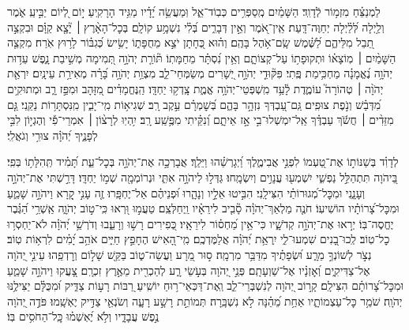 \documentclass[twoside, openany, parskip=half, 11pt]{book}
\begin{document}
\begin{narrow}
לַמְנַצֵּ֗חַ מִזְמ֥וֹר לְֿדָוִֽד׃
הַשָּׁמַ֗יִם מְֽסַפְּרִ֥ים כְּבֽוֹד־אֵ֑ל וּֽמַעֲשֵׂ֥ה יָ֝דָ֗יו מַגִּ֥יד הָרָקִֽיעַ׃
י֣וֹם לְ֭יוֹם יַבִּ֣יעַֽ אֹ֑מֶר וְלַ֥יְלָה לְּ֝לַ֗יְלָה יְחַוֶּה־דָּֽעַת׃
אֵֽין־אֹ֭מֶר וְאֵ֣ין דְּבָרִ֑ים בְּ֝לִ֗י נִשְׁמָ֥ע קוֹלָֽם׃
בְּכׇל־הָאָ֨רֶץ ׀ יָ֘צָ֤א קַוָּ֗ם וּבִקְצֵ֣ה תֵ֭בֵל מִלֵּיהֶ֑ם לַ֝שֶּׁ֗מֶשׁ שָֽׂם־אֹ֥הֶל בָּהֶֽם׃
וְה֗וּא כְּ֭חָתָן יֹצֵ֣א מֵחֻפָּת֑וֹ יָשִׂ֥ישׂ כְּ֝גִבּ֗וֹר לָר֥וּץ אֹֽרַח׃
מִקְצֵ֤ה הַשָּׁמַ֨יִם ׀ מֽוֹצָא֗וֹ וּתְקוּפָת֥וֹ עַל־קְצוֹתָ֑ם וְאֵ֥ין נִ֝סְתָּ֗ר מֵחַמָּתֽוֹ׃
תּ֘וֹרַ֤ת יְהֹוָ֣ה תְּ֭מִימָה מְשִׁ֣יבַת נָ֑פֶשׁ עֵד֥וּת יְהֹוָ֥ה נֶ֝אֱמָנָ֗ה מַחְכִּ֥ימַת פֶּֽתִי׃
פִּקּ֘וּדֵ֤י יְהֹוָ֣ה יְ֭שָׁרִים מְשַׂמְּחֵי־לֵ֑ב מִצְוַ֥ת יְהֹוָ֥ה בָּ֝רָ֗ה מְאִירַ֥ת עֵינָֽיִם׃
יִרְאַ֤ת יְהֹוָ֨ה ׀ טְהוֹרָה֮ עוֹמֶ֢דֶת לָ֫עַ֥ד מִֽשְׁפְּטֵי־יְהֹוָ֥ה אֱמֶ֑ת צָֽדְק֥וּ יַחְדָּֽו׃
הַֽנֶּחֱמָדִ֗ים מִ֭זָּהָב וּמִפַּ֣ז רָ֑ב וּמְתוּקִ֥ים מִ֝דְּבַ֗שׁ וְנֹ֣פֶת צוּפִֽים׃
גַּֽם־עַ֭בְדְּךָ נִזְהָ֣ר בָּהֶ֑ם בְּ֝שׇׁמְרָ֗ם עֵ֣קֶב רָֽב׃
שְׁגִיא֥וֹת מִֽי־יָבִ֑ין מִֽנִּסְתָּר֥וֹת נַקֵּֽנִי׃
גַּ֤ם מִזֵּדִ֨ים ׀ חֲשֹׂ֬ךְ עַבְדֶּ֗ךָ אַֽל־יִמְשְׁלוּ־בִ֣י אָ֣ז אֵיתָ֑ם וְ֝נִקֵּ֗יתִי מִפֶּ֥שַֽׁע רָֽב׃
יִ֥הְיֽוּ לְרָצ֨וֹן ׀ אִמְרֵי־פִ֡י וְהֶגְי֣וֹן לִבִּ֣י לְפָנֶ֑יךָ יְ֝הֹוָ֗ה צוּרִ֥י וְגֹאֲלִֽי׃ 


\enlargethispage{\baselineskip}

לְדָוִ֗ד 
בְּשַׁנּוֹת֣וֹ אֶת־טַ֭עְמוֹ לִפְנֵ֣י אֲבִימֶ֑לֶךְ וַ֝יְגָרְשֵׁ֗הוּ וַיֵּלַֽךְ׃
אֲבָרְכָ֣ה אֶת־יְהֹוָ֣ה בְּכׇל־עֵ֑ת תָּ֝מִ֗יד תְּֽהִלָּת֥וֹ בְּפִֽי׃
בַּ֭יהֹוָה תִּתְהַלֵּ֣ל נַפְשִׁ֑י יִשְׁמְע֖וּ עֲנָוִ֣ים וְיִשְׂמָֽחוּ׃
גַּדְּל֣וּ לַיהֹוָ֣ה אִתִּ֑י וּנְרוֹמְמָ֖ה שְׁמ֣וֹ יַחְדָּֽו׃
דָּרַ֣שְׁתִּי אֶת־יְהֹוָ֣ה וְעָנָ֑נִי וּמִכׇּל־מְ֝גוּרוֹתַ֗י הִצִּילָֽנִי׃
הִבִּ֣יטוּ אֵלָ֣יו וְנָהָ֑רוּ וּ֝פְנֵיהֶ֗ם אַל־יֶחְפָּֽרוּ׃
זֶ֤ה עָנִ֣י קָ֭רָא וַיהֹוָ֣ה שָׁמֵ֑עַ וּמִכׇּל־צָ֝רוֹתָ֗יו הוֹשִׁיעֽוֹ׃
חֹנֶ֤ה מַלְאַךְ־יְהֹוָ֓ה סָ֘בִ֤יב לִירֵאָ֗יו וַֽיְחַלְּצֵֽם׃
טַעֲמ֣וּ וּ֭רְאוּ כִּֽי־ט֣וֹב יְהֹוָ֑ה אַֽשְׁרֵ֥י הַ֝גֶּ֗בֶר יֶחֱסֶה־בּֽוֹ׃
יְר֣אוּ אֶת־יְהֹוָ֣ה קְדֹשָׁ֑יו כִּי־אֵ֥ין מַ֝חְס֗וֹר לִירֵאָֽיו׃
כְּ֭פִירִים רָשׁ֣וּ וְרָעֵ֑בוּ וְדֹרְשֵׁ֥י יְ֝הֹוָ֗ה לֹא־יַחְסְר֥וּ כׇל־טֽוֹב׃
לְֽכוּ־בָ֭נִים שִׁמְעוּ־לִ֑י יִֽרְאַ֥ת יְ֝הֹוָ֗ה אֲלַמֶּדְכֶֽם׃
מִֽי־הָ֭אִישׁ הֶחָפֵ֣ץ חַיִּ֑ים אֹהֵ֥ב יָ֝מִ֗ים לִרְא֥וֹת טֽוֹב׃
נְצֹ֣ר לְשׁוֹנְךָ֣ מֵרָ֑ע וּ֝שְׂפָתֶ֗יךָ מִדַּבֵּ֥ר מִרְמָֽה׃
ס֣וּר מֵ֭רָע וַעֲשֵׂה־ט֑וֹב בַּקֵּ֖שׁ שָׁל֣וֹם וְרׇדְפֵֽהוּ׃
עֵינֵ֣י יְ֭הֹוָה אֶל־צַדִּיקִ֑ים וְ֝אׇזְנָ֗יו אֶל־שַׁוְעָתָֽם׃
פְּנֵ֣י יְ֭הֹוָה בְּעֹ֣שֵׂי רָ֑ע לְהַכְרִ֖ית מֵאֶ֣רֶץ זִכְרָֽם׃
צָ֭עֲקוּ וַיהֹוָ֣ה שָׁמֵ֑עַ וּמִכׇּל־צָ֝רוֹתָ֗ם הִצִּילָֽם׃
קָר֣וֹב יְ֭הֹוָה לְנִשְׁבְּרֵי־לֵ֑ב וְֽאֶת־דַּכְּאֵי־ר֥וּחַ יוֹשִֽׁיעַ׃
רַ֭בּוֹת רָע֣וֹת צַדִּ֑יק וּ֝מִכֻּלָּ֗ם יַצִּילֶ֥נּוּ יְהֹוָֽה׃
שֹׁמֵ֥ר כׇּל־עַצְמוֹתָ֑יו אַחַ֥ת מֵ֝הֵ֗נָּה לֹ֣א נִשְׁבָּֽרָה׃
תְּמוֹתֵ֣ת רָשָׁ֣ע רָעָ֑ה וְשֹׂנְאֵ֖י צַדִּ֣יק יֶאְשָֽׁמוּ׃
פֹּדֶ֣ה יְ֭הֹוָה נֶ֣פֶשׁ עֲבָדָ֑יו וְלֹ֥א יֶ֝אְשְׁמ֗וּ כׇּֽל־הַחֹסִ֥ים בּֽוֹ׃ 




\end{narrow}
\end{document}
